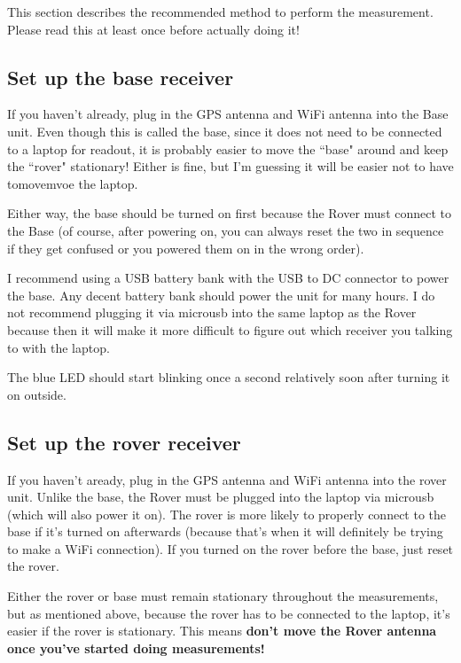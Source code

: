 \documentclass[usletter]{article}
\begin{document}
This section describes the recommended method to perform the measurement. Please read this at least once before actually doing it! 

\subsection{Set up the base receiver} 

If you haven't already, plug in the GPS antenna and WiFi antenna into the Base
unit. Even though this is called the base, since it does not need to be
connected to a laptop for readout, it is probably easier to move the ``base" around and
keep the ``rover" stationary!  Either is fine, but I'm guessing it will be easier not to have tomovemvoe the laptop. 

Either way, the base should be turned on first because
the Rover must connect to the Base (of course, after powering on, you can
always reset the two in sequence if they get confused or you powered them on in
the wrong order). 

I recommend using a USB battery bank with the USB to DC connector to power the
base. Any decent battery bank should power the unit for many hours. I do not
recommend plugging it via microusb into the same laptop as the Rover because then it will
make it more difficult to figure out which receiver you talking to with the
laptop. 

The blue LED should start blinking once a second relatively soon after turning it on outside. 


\subsection{Set up the rover receiver} 

If you haven't aready, plug in the GPS antenna and WiFi antenna into the rover
unit. Unlike the base, the Rover must be plugged into the laptop via microusb
(which will also power it on). The rover is more likely to properly connect to
the base if it's turned on afterwards (because that's when it will definitely
be trying to make a WiFi connection). If you turned on the rover before the
base, just reset the rover. 

Either the rover or base must remain stationary throughout the measurements, but as mentioned above, because the
rover has to be connected to the laptop, it's easier if the rover is
stationary.  This means \textbf{don't move the Rover antenna once you've started doing measurements!} 
\end{document}
